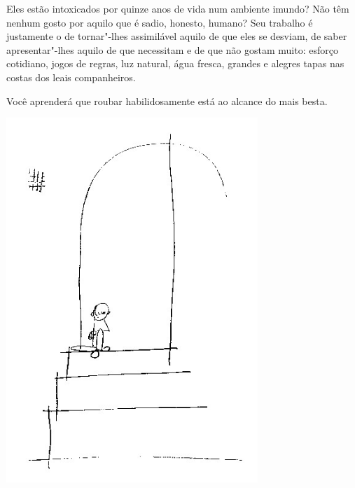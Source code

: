 \bigskip
\bigskip


Eles estão intoxicados por quinze anos de vida num ambiente imundo? Não
têm nenhum gosto por aquilo que é sadio, honesto, humano? Seu trabalho é
justamente o de tornar"-lhes assimilável aquilo de que eles se desviam,
de saber apresentar"-lhes aquilo de que necessitam e de que não gostam
muito: esforço cotidiano, jogos de regras, luz natural, água fresca,
grandes e alegres tapas nas costas dos leais companheiros.

\bigskip
\bigskip

Você aprenderá que roubar habilidosamente está ao alcance do mais besta.

\bigskip
\bigskip

\pagebreak
\thispagestyle{empty}

\begin{vplace}[.50]
\begin{center}
\includegraphics[width=95mm]{./imgs/Image_11.jpg}
\end{center}
\end{vplace}

\pagebreak


